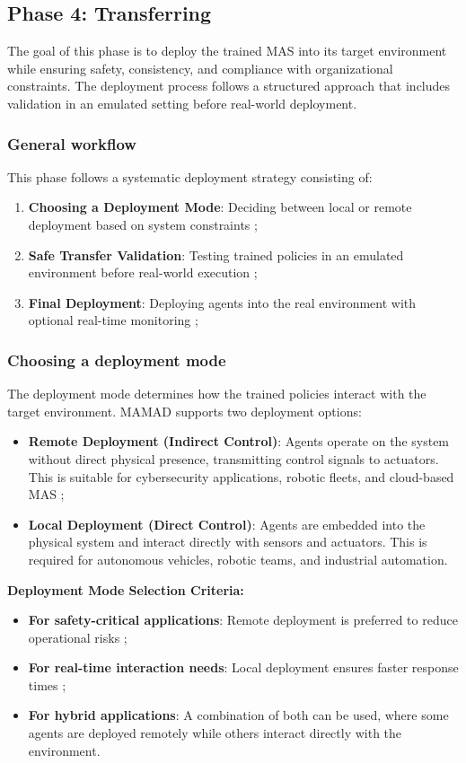 \documentclass[pdflatex,sn-mathphys-num]{sn-jnl}%
\theoremstyle{thmstyleone}%
\theoremstyle{thmstyletwo}%
\theoremstyle{thmstylethree}%
\begin{document}
\subsection{Phase 4: Transferring}

The goal of this phase is to deploy the trained MAS into its target environment while ensuring safety, consistency, and compliance with organizational constraints. The deployment process follows a structured approach that includes validation in an emulated setting before real-world deployment.

\subsubsection{General workflow}
This phase follows a systematic deployment strategy consisting of:
\begin{enumerate}
    \item \textbf{Choosing a Deployment Mode}: Deciding between local or remote deployment based on system constraints ;
    \item \textbf{Safe Transfer Validation}: Testing trained policies in an emulated environment before real-world execution ;
    \item \textbf{Final Deployment}: Deploying agents into the real environment with optional real-time monitoring ;
\end{enumerate}

\subsubsection{Choosing a deployment mode}
The deployment mode determines how the trained policies interact with the target environment. MAMAD supports two deployment options:

\begin{itemize}
    \item \textbf{Remote Deployment (Indirect Control)}: Agents operate on the system without direct physical presence, transmitting control signals to actuators. This is suitable for cybersecurity applications, robotic fleets, and cloud-based MAS ;
    \item \textbf{Local Deployment (Direct Control)}: Agents are embedded into the physical system and interact directly with sensors and actuators. This is required for autonomous vehicles, robotic teams, and industrial automation.
\end{itemize}

\noindent \textbf{Deployment Mode Selection Criteria:}
\begin{itemize}
    \item \textbf{For safety-critical applications}: Remote deployment is preferred to reduce operational risks ;
    \item \textbf{For real-time interaction needs}: Local deployment ensures faster response times ;
    \item \textbf{For hybrid applications}: A combination of both can be used, where some agents are deployed remotely while others interact directly with the environment.
\end{itemize}
\end{document}

